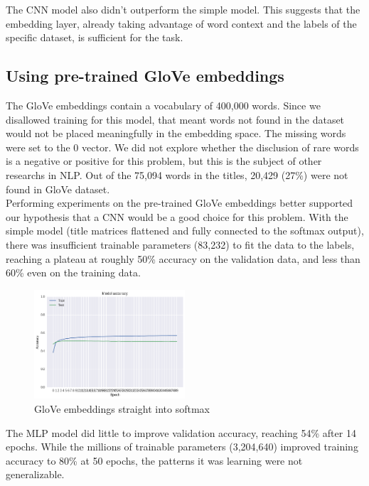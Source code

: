 \documentclass[jou,apacite, 10px]{apa6}
\begin{document}
The CNN model also didn't outperform the simple model. This suggests that the embedding layer, already taking advantage of word context and the labels of the specific dataset, is sufficient for the task.

\subsection{Using pre-trained GloVe embeddings}
The GloVe embeddings contain a vocabulary of 400,000 words. Since we disallowed training for this model, that meant words not found in the dataset would not be placed meaningfully in the embedding space. The missing words were set to the 0 vector. We did not explore whether the disclusion of rare words is a negative or positive for this problem, but this is the subject of other researchs in NLP. Out of the 75,094 words in the titles, 20,429 (27\%) were not found in GloVe dataset.\\

Performing experiments on the pre-trained GloVe embeddings better supported our hypothesis that a CNN would be a good choice for this problem. With the simple model (title matrices flattened and fully connected to the softmax output), there was insufficient trainable parameters (83,232) to fit the data to the labels, reaching a plateau at roughly 50\% accuracy on the validation data, and less than 60\% even on the training data.\\

\begin{figure}[h!]
\captionsetup{justification=centering}
    \centering
     \includegraphics[width=0.5\textwidth]{images/Training-Glove}
        \caption{GloVe embeddings straight into softmax}
\end{figure}

The MLP model did little to improve validation accuracy, reaching 54\% after 14 epochs. While the millions of trainable parameters (3,204,640) improved training accuracy to 80\% at 50 epochs, the patterns it was learning were not generalizable.\\
\end{document}
